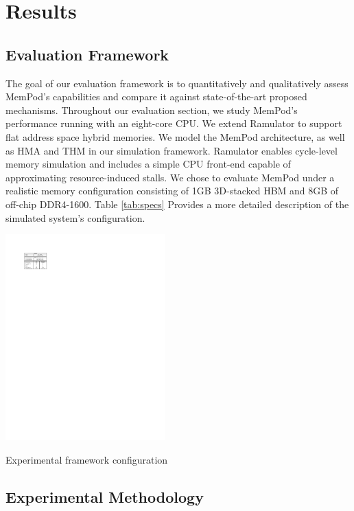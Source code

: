 \section{Results}
\label{sec:Results}

\subsection{Evaluation Framework}
\label{sub:Evaluation}

The goal of our evaluation framework is to quantitatively and qualitatively assess MemPod's capabilities and compare it against state-of-the-art proposed mechanisms. Throughout our evaluation section, we study MemPod's performance running with an eight-core CPU. We extend Ramulator \cite{kim-ramulator} to support flat address space hybrid memories. We model the MemPod architecture,
as well as HMA and THM in our simulation framework. Ramulator enables 
cycle-level memory simulation and includes a simple CPU front-end capable of approximating resource-induced stalls. We chose to evaluate MemPod under a realistic memory configuration consisting of 1GB 3D-stacked HBM \cite{JEDEC-HBM-REVISED} and 8GB of off-chip DDR4-1600. Table \ref{tab:specs} Provides a more detailed description of the simulated system's configuration.

\begin{table}[t]
  \includegraphics[width=0.46\textwidth]{figures/specs_table.pdf}
  \caption{Experimental framework configuration}
  \label{tab:specs}
\end{table}

\subsection{Experimental Methodology}
\label{sub:Experimental}

